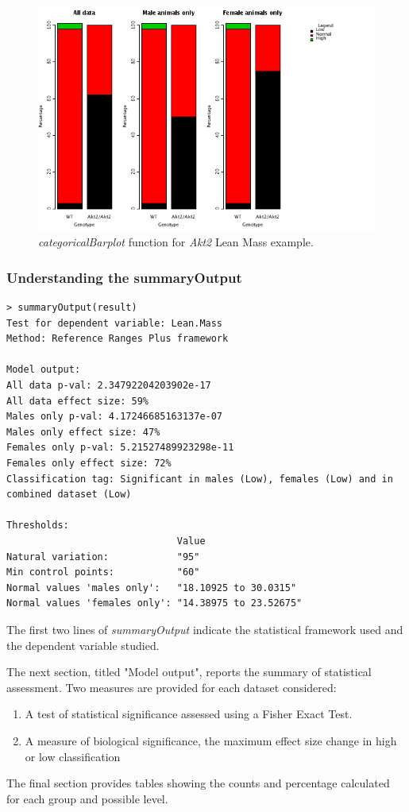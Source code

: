 \documentclass[12pt,a4paper]{article}
\begin{document}
\begin{figure}[H]%
\centerline{\includegraphics[scale=0.5]{RR_graph.png}}
\caption{\textit{categoricalBarplot} function for \textit{Akt2} Lean Mass example.}\label{fig:16a}
\end{figure}


\subsubsection{Understanding the summaryOutput}

\begingroup
    \fontsize{8pt}{12pt}\selectfont
\begin{verbatim}
> summaryOutput(result)
Test for dependent variable: Lean.Mass
Method: Reference Ranges Plus framework

Model output:
All data p-val: 2.34792204203902e-17
All data effect size: 59%
Males only p-val: 4.17246685163137e-07
Males only effect size: 47%
Females only p-val: 5.21527489923298e-11
Females only effect size: 72%
Classification tag: Significant in males (Low), females (Low) and in combined dataset (Low)

Thresholds:
                              Value                 
Natural variation:            "95"                  
Min control points:           "60"                  
Normal values 'males only':   "18.10925 to 30.0315" 
Normal values 'females only': "14.38975 to 23.52675"
\end{verbatim}
\endgroup 

The first two lines of \textit{summaryOutput} indicate the statistical framework used and the dependent variable studied.  

The next section, titled "Model output", reports the summary of statistical assessment. Two measures are provided for each dataset considered:
\begin{enumerate}
\item A test of statistical significance assessed using a Fisher Exact Test. 
\item A measure of biological significance, the maximum effect size change in high or low classification
\end{enumerate}
The final section provides tables showing the counts and percentage calculated for each group and possible level. 
\end{document}
